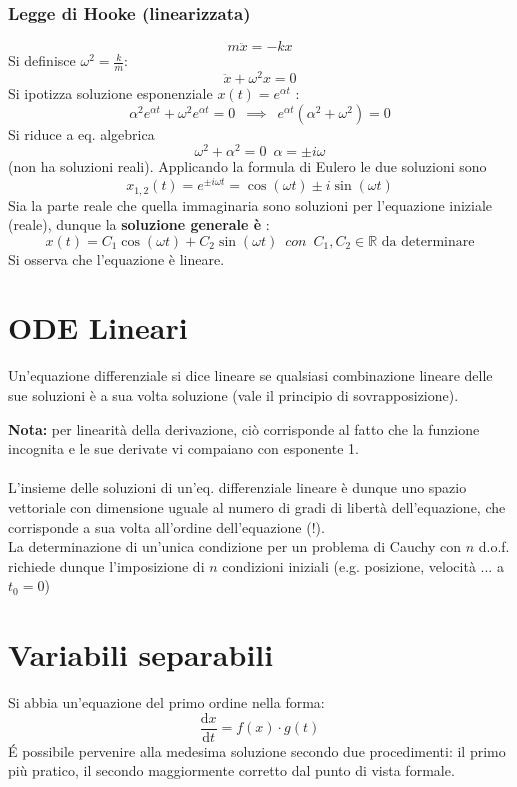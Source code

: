 \documentclass[10pt, oneside]{book}
\theoremstyle{plain}
\begin{document}
\subsubsection*{Legge di Hooke (linearizzata)}
\[m\ddot x = - k x\]
Si definisce $\omega^2 = \frac{k}{m}$:
\[\ddot x + \omega^2 x = 0\]
Si ipotizza soluzione esponenziale $x(t) = e^{\alpha t}$ :
\[\alpha^2 e^{\alpha t} + \omega^2 e^{\alpha t} = 0 \enspace \implies \enspace e^{\alpha t} (\alpha^2 + \omega^2) = 0\]
Si riduce a eq. algebrica
\[\omega^2 + \alpha^2 = 0 \enspace \alpha = \pm i \omega\]
(non ha soluzioni reali). Applicando la formula di Eulero le due soluzioni sono
\[x_{1,2}(t) = e^{\pm i \omega t} = \cos(\omega t) \pm i \sin(\omega t)\]
Sia la parte reale che quella immaginaria sono soluzioni per l'equazione iniziale (reale), dunque la \textbf{soluzione generale è} :
\[\boxed{x(t) = C_1 \cos(\omega t) + C_2 \sin(\omega t)} \enspace con \enspace C_1, C_2 \in \mathbb{R} \textrm{ da determinare}\]
Si osserva che l'equazione è lineare.

\section{ODE Lineari}

\begin{defin}
    Un'equazione differenziale si dice lineare se qualsiasi combinazione lineare delle sue soluzioni è a sua volta soluzione (vale il principio di sovrapposizione).
\end{defin}
\textbf{Nota:} per linearità della derivazione, ciò corrisponde al fatto che la funzione incognita e le sue derivate vi compaiano con esponente 1.
\\~\\L'insieme delle soluzioni di un'eq. differenziale lineare è dunque uno spazio vettoriale con dimensione uguale al numero di gradi di libertà dell'equazione, che corrisponde a sua volta all'ordine dell'equazione (!).
\\La determinazione di un'unica condizione per un problema di Cauchy con $n$ d.o.f. richiede dunque l'imposizione di $n$ condizioni iniziali (e.g. posizione, velocità ... a $t_0=0$)

\section{Variabili separabili}
Si abbia un'equazione del primo ordine nella forma:
\[\frac{\textrm{d}x}{\textrm{d}t} = f(x) \cdot g(t)\]
\'E possibile pervenire alla medesima soluzione secondo due procedimenti: il primo più pratico, il secondo maggiormente corretto dal punto di vista formale.
\end{document}
